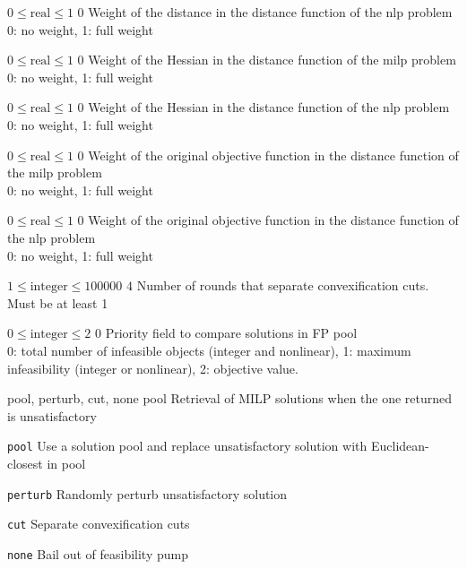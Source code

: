%
{$0\leq\textrm{real}\leq1$}%
{$0$}%
{Weight of the distance in the distance function of the nlp problem\\
0: no weight, 1: full weight}%
{}

%
{$0\leq\textrm{real}\leq1$}%
{$0$}%
{Weight of the Hessian in the distance function of the milp problem\\
0: no weight, 1: full weight}%
{}

%
{$0\leq\textrm{real}\leq1$}%
{$0$}%
{Weight of the Hessian in the distance function of the nlp problem\\
0: no weight, 1: full weight}%
{}

%
{$0\leq\textrm{real}\leq1$}%
{$0$}%
{Weight of the original objective function in the distance function of the milp problem\\
0: no weight, 1: full weight}%
{}

%
{$0\leq\textrm{real}\leq1$}%
{$0$}%
{Weight of the original objective function in the distance function of the nlp problem\\
0: no weight, 1: full weight}%
{}

%
{$1\leq\textrm{integer}\leq100000$}%
{$4$}%
{Number of rounds that separate convexification cuts. Must be at least 1}%
{}

%
{$0\leq\textrm{integer}\leq2$}%
{$0$}%
{Priority field to compare solutions in FP pool\\
0: total number of infeasible objects (integer and nonlinear), 1: maximum infeasibility (integer or nonlinear), 2: objective value.}%
{}

%
{\ttfamily pool, perturb, cut, none}%
{pool}%
{Retrieval of MILP solutions when the one returned is unsatisfactory}%
{\begin{list}{}{
\setlength{\parsep}{0em}
\setlength{\leftmargin}{5ex}
\setlength{\labelwidth}{2ex}
\setlength{\itemindent}{0ex}
\setlength{\topsep}{0pt}}
\item[\texttt{pool}] Use a solution pool and replace unsatisfactory solution with Euclidean-closest in pool
\item[\texttt{perturb}] Randomly perturb unsatisfactory solution
\item[\texttt{cut}] Separate convexification cuts
\item[\texttt{none}] Bail out of feasibility pump
\end{list}
}


